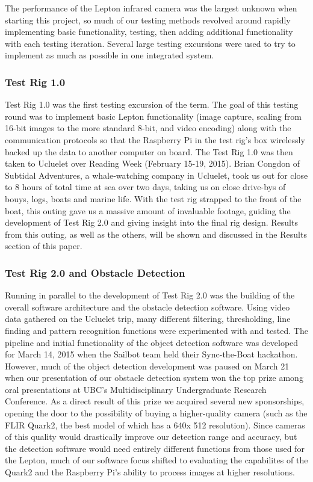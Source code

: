 The performance of the Lepton infrared camera was the largest unknown when starting this project, so much of our testing methods revolved around rapidly implementing basic functionality, testing, then adding additional functionality with each testing iteration. Several large testing excursions were used to try to implement as much as possible in one integrated system.


\subsubsection{\label{sec:discussion:testing:testrig1}Test Rig 1.0}

Test Rig 1.0 was the first testing excursion of the term. The goal of this testing round was to implement basic Lepton functionality (image capture, scaling from 16-bit images to the more standard 8-bit, and video encoding) along with the communication protocols so that the Raspberry Pi in the test rig's box wirelessly backed up the data to another computer on board. The Test Rig 1.0 was then taken to Ucluelet over Reading Week (February 15-19, 2015). Brian Congdon of Subtidal Adventures, a whale-watching company in Ucluelet, took us out for close to 8 hours of total time at sea over two days, taking us on close drive-bys of bouys, logs, boats and marine life. With the test rig strapped to the front of the boat, this outing gave us a massive amount of invaluable footage, guiding the development of Test Rig 2.0 and giving insight into the final rig design. Results from this outing, as well as the others, will be shown and discussed in the Results section of this paper.




\subsubsection{\label{sec:discussion:testing:testrig2}Test Rig 2.0 and Obstacle Detection}

Running in parallel to the development of Test Rig 2.0 was the building of the overall software architecture and the obstacle detection software. Using video data gathered on the Ucluelet trip, many different filtering, thresholding, line finding and pattern recognition functions were experimented with and tested. The pipeline and initial functionality of the object detection software was developed for March 14, 2015 when the Sailbot team held their Sync-the-Boat hackathon. However, much of the object detection development was paused on March 21 when our presentation of our obstacle detection system won the top prize among oral presentations at UBC's Multidisciplinary Undergraduate Research Conference. As a direct result of this prize we acquired several new sponsorships, opening the door to the possibility of buying a higher-quality camera (such as the FLIR Quark2, the best model of which has a 640x 512 resolution). Since cameras of this quality would drastically improve our detection range and accuracy, but the detection software would need entirely different functions from those used for the Lepton, much of our software focus shifted to evaluating the capabilites of the Quark2 and the Raspberry Pi's ability to process images at higher resolutions.

